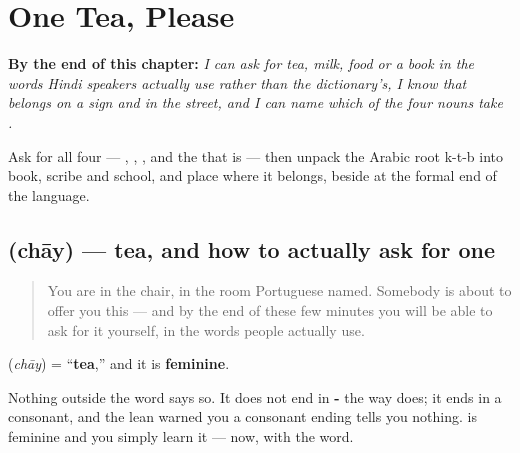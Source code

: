
\chapter{One Tea, Please}
\label{ch:hi-one-tea-please}

\begin{chapteropening}
\textbf{By the end of this chapter:} \emph{I can ask for tea, milk, food or a book in the words Hindi speakers actually use rather than the dictionary's, I know that  belongs on a sign and  in the street, and I can name which of the four nouns take .}

Ask for all four —   ,   ,  , and the  that is  — then unpack the Arabic root k-t-b into book, scribe and school, and place  where it belongs, beside  at the formal end of the language.
\end{chapteropening}

\section[\texorpdfstring{\hi{एक} \hi{चाय} \hi{दीजिए} (ek chāy dījie)}{एक चाय दीजिए (ek chāy dījie)}]{ (chāy) — tea, and how to actually ask for one}

\label{lesson:HI-C37-chai}



\begin{quote}
You are in the chair, in the room Portuguese named. Somebody is about to offer you this — and by the end of these few minutes you will be able to ask for it yourself, in the words people actually use.
\end{quote}

\begin{grammarlens}[title={Grammar Lens: the lean fails, quietly}]
\textbf{} (\emph{chāy}) = \textquotedblleft{}\textbf{tea},\textquotedblright{} and it is \textbf{feminine}.

Nothing outside the word says so. It does not end in \textbf{-} the way \textbf{} does; it ends in a consonant, and the lean warned you a consonant ending tells you nothing. \textbf{} is feminine and you simply learn it — now, with the word.
\end{grammarlens}

